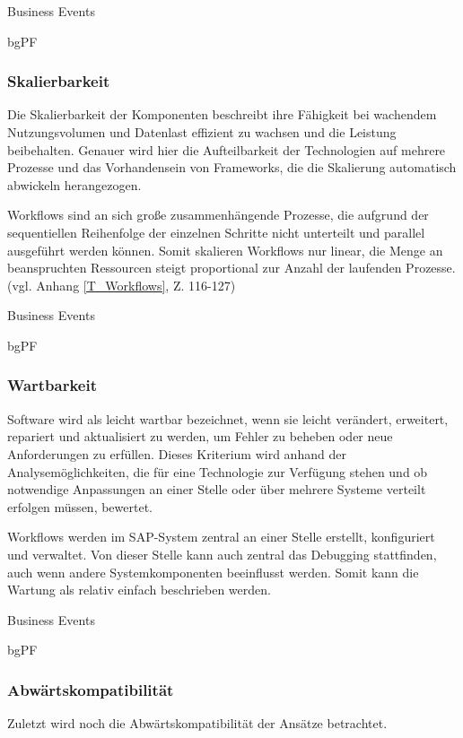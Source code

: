Business Events

bgPF

\subsubsection{Skalierbarkeit}

Die Skalierbarkeit der Komponenten beschreibt ihre Fähigkeit bei wachendem Nutzungsvolumen und Datenlast effizient zu wachsen und die Leistung beibehalten. Genauer wird hier die Aufteilbarkeit der Technologien auf mehrere Prozesse und das Vorhandensein von Frameworks, die die Skalierung automatisch abwickeln herangezogen.

Workflows sind an sich gro{\ss}e zusammenhängende Prozesse, die aufgrund der sequentiellen Reihenfolge der einzelnen Schritte nicht unterteilt und \zB parallel ausgeführt werden können. Somit skalieren Workflows nur linear, die Menge an beanspruchten Ressourcen steigt proportional zur Anzahl der laufenden Prozesse. (vgl. Anhang \ref{T_Workflows}, Z. 116-127)

Business Events

bgPF

\subsubsection{Wartbarkeit}

Software wird als leicht wartbar bezeichnet, wenn sie leicht verändert, erweitert, repariert und aktualisiert zu werden, um Fehler zu beheben oder neue Anforderungen zu erfüllen. Dieses Kriterium wird anhand der Analysemöglichkeiten, die für eine Technologie zur Verfügung stehen und ob notwendige Anpassungen an einer Stelle oder über mehrere Systeme verteilt erfolgen müssen, bewertet.

Workflows werden im SAP-System zentral an einer Stelle erstellt, konfiguriert und verwaltet. Von dieser Stelle kann auch zentral das Debugging stattfinden, auch wenn andere Systemkomponenten beeinflusst werden. Somit kann die Wartung als relativ einfach beschrieben werden. 

Business Events

bgPF

\subsubsection{Abwärtskompatibilität}

Zuletzt wird noch die Abwärtskompatibilität der Ansätze betrachtet. 

